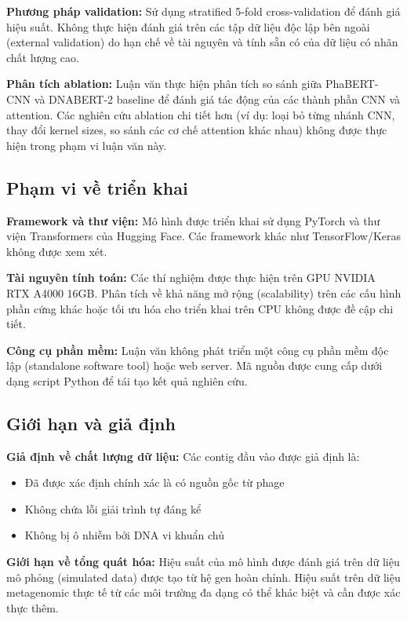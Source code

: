 \textbf{Phương pháp validation:} Sử dụng stratified 5-fold cross-validation để đánh giá hiệu suất. Không thực hiện đánh giá trên các tập dữ liệu độc lập bên ngoài (external validation) do hạn chế về tài nguyên và tính sẵn có của dữ liệu có nhãn chất lượng cao.

\textbf{Phân tích ablation:} Luận văn thực hiện phân tích so sánh giữa PhaBERT-CNN và DNABERT-2 baseline để đánh giá tác động của các thành phần CNN và attention. Các nghiên cứu ablation chi tiết hơn (ví dụ: loại bỏ từng nhánh CNN, thay đổi kernel sizes, so sánh các cơ chế attention khác nhau) không được thực hiện trong phạm vi luận văn này.

\subsection{Phạm vi về triển khai}

\textbf{Framework và thư viện:} Mô hình được triển khai sử dụng PyTorch và thư viện Transformers của Hugging Face. Các framework khác như TensorFlow/Keras không được xem xét.

\textbf{Tài nguyên tính toán:} Các thí nghiệm được thực hiện trên GPU NVIDIA RTX A4000 16GB. Phân tích về khả năng mở rộng (scalability) trên các cấu hình phần cứng khác hoặc tối ưu hóa cho triển khai trên CPU không được đề cập chi tiết.

\textbf{Công cụ phần mềm:} Luận văn không phát triển một công cụ phần mềm độc lập (standalone software tool) hoặc web server. Mã nguồn được cung cấp dưới dạng script Python để tái tạo kết quả nghiên cứu.

\subsection{Giới hạn và giả định}

\textbf{Giả định về chất lượng dữ liệu:} Các contig đầu vào được giả định là:
\begin{itemize}
    \item Đã được xác định chính xác là có nguồn gốc từ phage
    \item Không chứa lỗi giải trình tự đáng kể
    \item Không bị ô nhiễm bởi DNA vi khuẩn chủ
\end{itemize}

\textbf{Giới hạn về tổng quát hóa:} Hiệu suất của mô hình được đánh giá trên dữ liệu mô phỏng (simulated data) được tạo từ hệ gen hoàn chỉnh. Hiệu suất trên dữ liệu metagenomic thực tế từ các môi trường đa dạng có thể khác biệt và cần được xác thực thêm.

